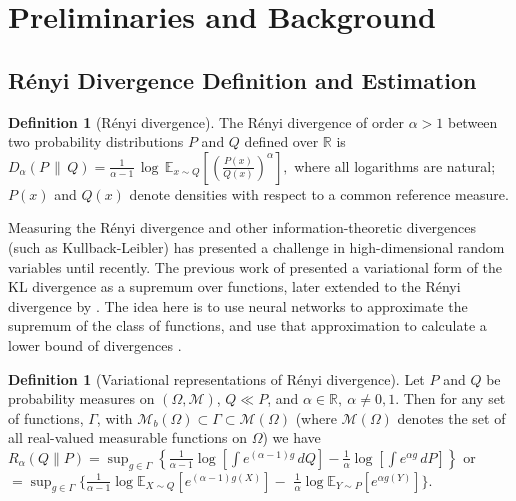 \documentclass{article}
\theoremstyle{plain}
\theoremstyle{definition}
\newtheorem{definition}[theorem]{Definition}
\theoremstyle{remark}
\begin{document}
\section{Preliminaries and Background}
\label{sec:prelims}

\subsection{R\'enyi Divergence Definition and Estimation}
\label{sec:rdp-definition}



\begin{definition}[R\'enyi divergence]
    The R\'enyi divergence of order $\alpha>1$ between two probability distributions $P$ and $Q$ defined over $\mathbb{R}$ is
\(
D_{\alpha}(P \,\|\, Q)
= \frac{1}{\alpha-1}\,
\log \,\mathbb{E}_{x \sim Q}\!\left[\left(\frac{P(x)}{Q(x)}\right)^{\alpha}\right],
\)
where all logarithms are natural; $P(x)$ and $Q(x)$ denote densities with respect to a common reference measure.
\label{def:rd}
\end{definition}
Measuring the R\'enyi divergence and other information-theoretic divergences (such as Kullback-Leibler) has presented a challenge in high-dimensional random variables until recently. The previous work of\cite{donsker1983asymptotic} presented a variational form of the KL divergence as a supremum over functions, later extended to the R\'enyi divergence by \cite{anantharam2018variational}. The idea here is to use neural networks to approximate the supremum of the class of functions, and use that approximation to calculate a lower bound of divergences \cite{belghazi2018mine, birrell2021variational}. 
\begin{definition}[Variational representations of R\'enyi divergence]
Let $P$ and $Q$ be probability measures on $(\Omega, \mathcal{M})$, $Q \ll P$, and $\alpha \in \mathbb{R},\ \alpha \neq 0, 1$. Then for any set of functions, $\Gamma$, with $\mathcal{M}_b(\Omega) \subset \Gamma \subset \mathcal{M}(\Omega)$ (where $\mathcal{M}(\Omega)$ denotes the set of all real-valued measurable functions on $\Omega$) we have
$
R_\alpha(Q\|P)
= \sup_{g \in \Gamma} \left\{ 
\frac{1}{\alpha - 1} \log\left[ \int e^{(\alpha - 1) g} \, dQ \right]
- \frac{1}{\alpha} \log\left[ \int e^{\alpha g} \, dP \right]
\right\}
$
or
$
=\sup_{g\in\Gamma}
\{\frac{1}{\alpha-1}\log \mathbb{E}_{X\sim Q}\!\left[e^{(\alpha-1)g(X)}\right] -$
$\frac{1}{\alpha}\log \mathbb{E}_{Y\sim P}\!\left[e^{\alpha g(Y)}\right]\}.
$
\end{definition}
\end{document}
